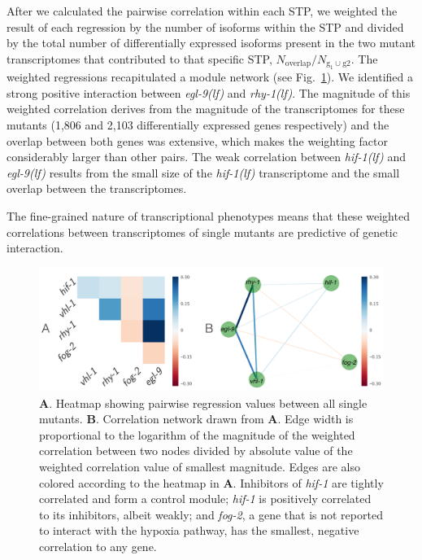 \documentclass[10pt, onecolumn]{article}
\newcommand{\gene}[1]{\emph{#1}}
\newcommand{\egl}{\emph{\mbox{egl-9}(lf)}}
\newcommand{\rhy}{\emph{\mbox{rhy-1}(lf)}}
\newcommand{\hif}{\emph{\mbox{hif-1(lf)}}}
\newcommand{\egln}{1,806}
\newcommand{\rhyn}{2,103}
\begin{document}
After we calculated the pairwise correlation within each STP,
we weighted the result of each regression by the
number of isoforms within the STP and
divided by the total number of differentially expressed isoforms present in the
two mutant transcriptomes that contributed to that specific STP,
$N_\mathrm{overlap}/N_{\mathrm{g_1} \cup \mathrm{g2}}$.
The weighted regressions recapitulated a module network (see Fig.~\ref{fig:heatmap}).
We identified a strong positive interaction between \egl{} and \rhy{}.
The magnitude of this weighted correlation derives from the magnitude of the
transcriptomes for these mutants (\egln{} and \rhyn{} differentially expressed
genes respectively) and the overlap between both genes was
extensive, which makes the weighting factor considerably larger than other pairs.
The weak correlation between \hif{} and \egl{} results from the small size of
the \hif{} transcriptome and the small overlap between the transcriptomes.

The fine-grained nature of transcriptional phenotypes means that these weighted
correlations between transcriptomes of single mutants are predictive of genetic
interaction.

\begin{figure}[tbhp]
\centering
\includegraphics[width=\linewidth]{../figs/bayesian-heatmap-horizontal.pdf}
\caption{
\textbf{A}. Heatmap showing pairwise regression values between all
single mutants. \textbf{B}. Correlation network drawn from \textbf{A}. Edge
width is proportional to the logarithm of the magnitude of the weighted
correlation between two nodes divided by absolute value of the weighted
correlation value of smallest magnitude. Edges are also colored according to the
heatmap in \textbf{A}. Inhibitors of \gene{hif-1} are tightly correlated and form
a control module;
\gene{hif-1} is positively correlated to its inhibitors, albeit weakly;
and
\gene{fog-2}, a gene that is not reported to interact with the hypoxia pathway,
has the smallest, negative correlation to any gene.
}
\label{fig:heatmap}
\end{figure}
\end{document}
